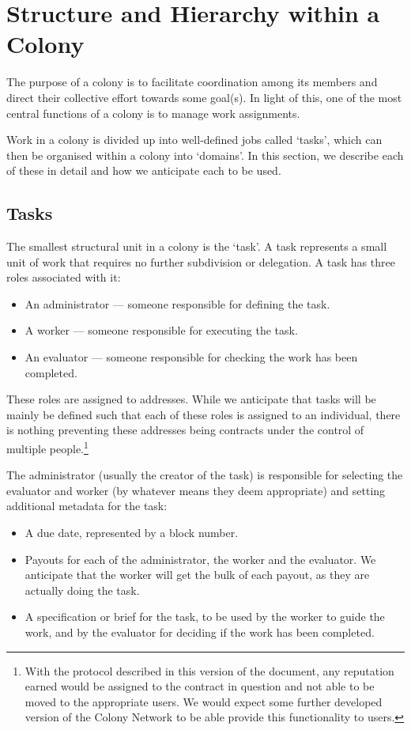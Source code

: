 \section{Structure and Hierarchy within a Colony}\label{sec:colony-structure}
The purpose of a colony is to facilitate coordination among its members and direct their collective effort towards some goal(s). In light of this, one of the most central functions of a colony is to manage work assignments.

Work in a colony is divided up into well-defined jobs called `tasks', which can then be organised within a colony into `domains'. In this section, we describe each of these in detail and how we anticipate each to be used.

\subsection{Tasks}\label{sec:tasks}

The smallest structural unit in a colony is the `task'. A task represents a small unit of work that requires no further subdivision or delegation. A task has three roles associated with it:
\begin{itemize}
\item An administrator --- someone responsible for defining the task.
\item A worker --- someone responsible for executing the task.
\item An evaluator --- someone responsible for checking the work has been completed.
\end{itemize}

These roles are assigned to addresses. While we anticipate that tasks will be mainly be defined such that each of these roles is assigned to an individual, there is nothing preventing these addresses being contracts under the control of multiple people.\footnote{With the protocol described in this version of the document, any reputation earned would be assigned to the contract in question and not able to be moved to the appropriate users. We would expect some further developed version of the Colony Network to be able provide this functionality to users.}

The administrator (usually the creator of the task) is responsible for selecting the evaluator and worker (by whatever means they deem appropriate) and setting additional metadata for the task:

\begin{itemize}
\item A due date, represented by a block number.
\item Payouts for each of the administrator, the worker and the evaluator. We anticipate that the worker will get the bulk of each payout, as they are actually doing the task.
\item A specification or brief for the task, to be used by the worker to guide the work, and by the evaluator for deciding if the work has been completed.
\end{itemize}

